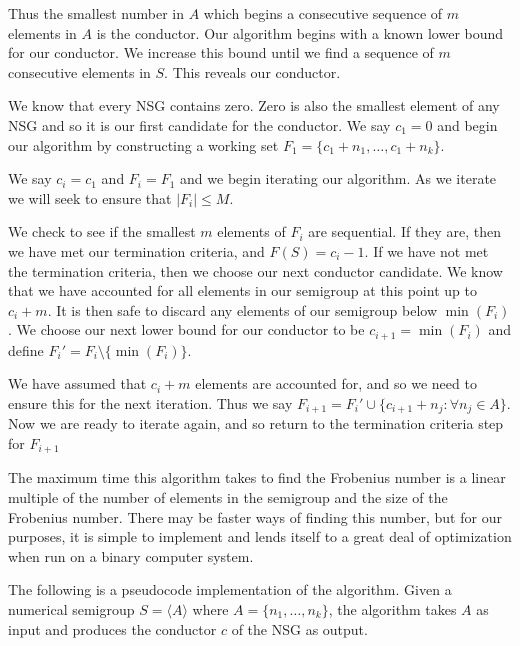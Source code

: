 \documentclass[11pt]{amsart}
\theoremstyle{plain}
\theoremstyle{definition}
\begin{document}
Thus the smallest number in $A$ which begins a consecutive sequence of $m$ elements in $A$ is the conductor.
Our algorithm begins with a known lower bound for our conductor.
We increase this bound until we find a sequence of $m$ consecutive elements in $S$. This reveals our conductor.

We know that every NSG contains zero.
Zero is also the smallest element of any NSG and so it is our first candidate for the conductor.
We say $c_1=0$ and begin our algorithm by constructing a working set $F_1=\{c_1+n_1,\dots, c_1+n_k\}$.

We say $c_i=c_1$ and $F_i=F_1$ and we begin iterating our algorithm.
As we iterate we will seek to ensure that $|F_i|\le M$.

We check to see if the smallest $m$ elements of $F_i$ are sequential.
If they are, then we have met our termination criteria, and $F(S)=c_i-1$.
If we have not met the termination criteria, then we choose our next conductor candidate.
We know that we have accounted for all elements in our semigroup at this point up to $c_i+m$.
It is then safe to discard any elements of our semigroup below $\min(F_i)$.
We choose our next lower bound for our conductor to be $c_{i+1}=\min(F_i)$ and define $F_i'=F_i\setminus\{\min(F_i)\}$.

We have assumed that $c_i+m$ elements are accounted for, and so we need to ensure this for the next iteration.
Thus we say $F_{i+1}=F_i'\cup \{c_{i+1}+n_j:\forall n_j\in A\}$. Now we are ready to iterate again, and so return to the termination criteria step for $F_{i+1}$

The maximum time this algorithm takes to find the Frobenius number is a linear
multiple of the number of elements in the semigroup and the size of the
Frobenius number. There may be faster ways of finding this number, but for our
purposes, it is simple to implement and lends itself to a great deal of optimization when run on a binary computer system.\cite{frobmask}

The following is a pseudocode implementation of the algorithm. Given a numerical semigroup $S=\langle A\rangle$ where $A=\{n_1,\dots,n_k\}$, the algorithm takes $A$ as input and produces the conductor $c$ of the NSG as output.
\end{document}
